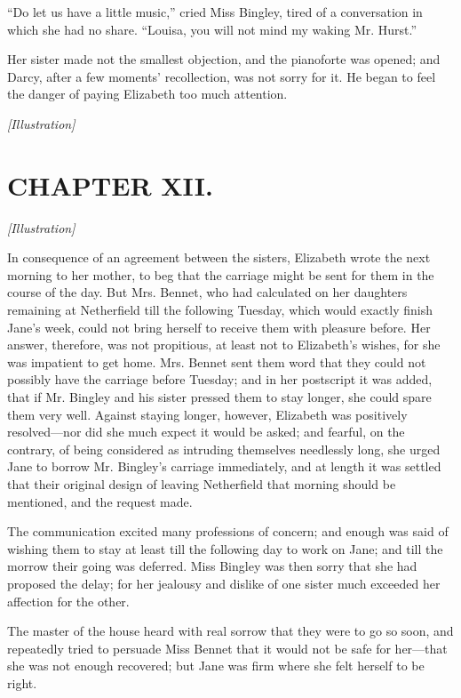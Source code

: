 \documentclass[12pt]{book}
\begin{document}
``Do let us have a little music,'' cried Miss Bingley, tired of a conversation in which she had no share. ``Louisa, you will not mind my waking Mr. Hurst.''

Her sister made not the smallest objection, and the pianoforte was opened; and Darcy, after a few moments' recollection, was not sorry for it. He began to feel the danger of paying Elizabeth too much attention.

\emph{[Illustration]}

\chapter{CHAPTER XII.}

\emph{[Illustration]}

In consequence of an agreement between the sisters, Elizabeth wrote the next morning to her mother, to beg that the carriage might be sent for them in the course of the day. But Mrs. Bennet, who had calculated on her daughters remaining at Netherfield till the following Tuesday, which would exactly finish Jane's week, could not bring herself to receive them with pleasure before. Her answer, therefore, was not propitious, at least not to Elizabeth's wishes, for she was impatient to get home. Mrs. Bennet sent them word that they could not possibly have the carriage before Tuesday; and in her postscript it was added, that if Mr. Bingley and his sister pressed them to stay longer, she could spare them very well. Against staying longer, however, Elizabeth was positively resolved---nor did she much expect it would be asked; and fearful, on the contrary, of being considered as intruding themselves needlessly long, she urged Jane to borrow Mr. Bingley's carriage immediately, and at length it was settled that their original design of leaving Netherfield that morning should be mentioned, and the request made.

The communication excited many professions of concern; and enough was said of wishing them to stay at least till the following day to work on Jane; and till the morrow their going was deferred. Miss Bingley was then sorry that she had proposed the delay; for her jealousy and dislike of one sister much exceeded her affection for the other.

The master of the house heard with real sorrow that they were to go so soon, and repeatedly tried to persuade Miss Bennet that it would not be safe for her---that she was not enough recovered; but Jane was firm where she felt herself to be right.
\end{document}
